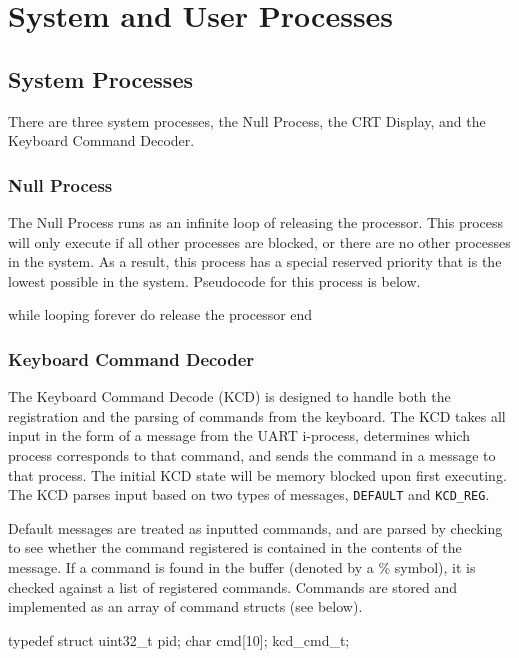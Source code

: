 \documentclass[se]{uw-wkrpt}
\begin{document}
\section{System and User Processes}\label{sec:proc}

\subsection{System Processes}

There are three system processes, the Null Process, the CRT Display, and the Keyboard Command Decoder.

\subsubsection{Null Process}

The Null Process runs as an infinite loop of releasing the processor. This process will only execute if all other processes are blocked, or there are no other processes in the system. As a result, this process has a special reserved priority that is the lowest possible in the system. Pseudocode for this process is below.

\begin{code}
while looping forever do
    release the processor
end
\end{code}

\subsubsection{Keyboard Command Decoder}

The Keyboard Command Decode (KCD) is designed to handle both the registration and the parsing of commands from the keyboard. The KCD takes all input in the form of a message from the UART i-process, determines which process corresponds to that command, and sends the command in a message to that process. The initial KCD state will be memory blocked upon first executing. The KCD parses input based on two types of messages, \texttt{DEFAULT} and \texttt{KCD\_REG}.

Default messages are treated as inputted commands, and are parsed by checking to see whether the command registered is contained in the contents of the message. If a command is found in the buffer (denoted by a \% symbol), it is checked against a list of registered commands. Commands are stored and implemented as an array of command structs (see below).
\begin{code}
typedef struct {
    uint32_t pid;
    char cmd[10];
} kcd_cmd_t;
\end{code}
\end{document}
